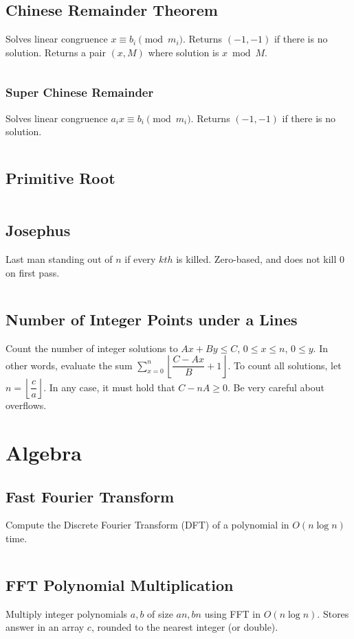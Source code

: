 \documentclass[8pt,a4paper,landscape,oneside]{amsart}
\newcommand{\code}[1]{\inputminted[fontsize=\normalsize,baselinestretch=1]{cpp}{_code/#1}}
\begin{document}
\begin{multicols*}{3}
  \subsection{Chinese Remainder Theorem}
    Solves linear congruence $x \equiv b_i \pmod {m_i}$. Returns $(-1,-1)$ if there is no solution. Returns a pair $(x, M)$ where solution is $x \bmod M$.
    \code{numtheory/chinese-remainder.cpp}
    \subsubsection{Super Chinese Remainder}
      Solves linear congruence $a_i x \equiv b_i \pmod {m_i}$. Returns $(-1,-1)$ if there is no solution.
      \code{numtheory/super-crt.cpp}
  \subsection{Primitive Root}
    \code{numtheory/primitive_root.cpp}
  \subsection{Josephus}
    Last man standing out of $n$ if every $kth$ is killed. Zero-based, and does not kill $0$ on first pass.
    \code{numtheory/josephus.cpp}
  \subsection{Number of Integer Points under a Lines}
    Count the number of integer solutions to $Ax+By \leq C$, $0 \leq x \leq n$,
    $0 \leq y$. In other words, evaluate the sum $\sum_{x=0}^n\left\lfloor\dfrac{C-Ax}{B}+1\right\rfloor$.
    To count all solutions, let $n = \left\lfloor\dfrac{c}{a}\right\rfloor$.
    In any case, it must hold that $C-nA \geq 0$. Be very careful about overflows.
\section{Algebra}
  \subsection{Fast Fourier Transform}
    Compute the Discrete Fourier Transform (DFT) of a polynomial in $O(n \log n)$ time.
    \code{algebra/fft.cpp}
  \subsection{FFT Polynomial Multiplication}
    Multiply integer polynomials $a, b$ of size $an, bn$ using FFT in $O(n \log n)$. Stores answer in an array $c$, rounded to the nearest integer (or double).
    \code{algebra/fft-poly-mul.cpp}

\end{multicols*}
\end{document}
